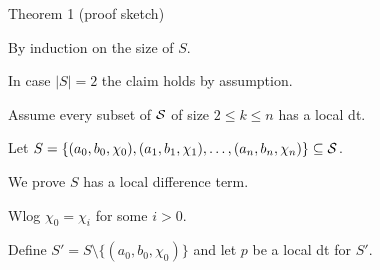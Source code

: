 \documentclass[notes=hide,12pt,xcolor=dvipsnames%
   ]{beamer}
\theoremstyle{definition}
\begin{document}
\begin{frame}[label=local-diff-term-res]{Theorem 1 (proof sketch)}

  By induction on the size of $S$.

  In case $|S| = 2$ the claim holds by assumption.

  Assume every subset of $\mathcal{S}$ of size $2\leq k \leq n$ has a local dt.

  Let $S = \{(a_0, b_0, \chi_0), (a_1, b_1, \chi_1), \dots, (a_{n}, b_{n},\chi_{n})\} \subseteq \mathcal{S}$.
  
  We prove $S$ has a local difference term.

  \pause
  Wlog $\chi_0 = \chi_i$ for some $i>0$.


  Define $S' = S \setminus \{(a_0, b_0, \chi_0)\}$ and let $p$ be a local dt for $S'$.

\end{frame}
\end{document}
